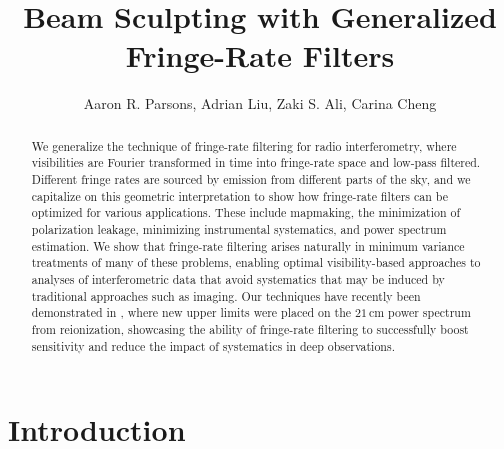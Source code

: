 \documentclass[twocolumn,apj,numberedappendix]{emulateapj}
\begin{document}
\title{Beam Sculpting with Generalized Fringe-Rate Filters}

\author{
Aaron R. Parsons,
Adrian Liu,
Zaki S. Ali,
Carina Cheng
}


\begin{abstract}
We generalize the technique of fringe-rate filtering for radio interferometry, where visibilities 
are Fourier transformed in time into fringe-rate space and low-pass filtered. Different fringe rates
are sourced by emission from different parts of the sky, and we capitalize on this geometric
interpretation to show how fringe-rate filters can be optimized for various applications.
These
include mapmaking, the minimization of polarization leakage, minimizing instrumental systematics,
and power spectrum estimation. We show that fringe-rate filtering arises naturally in minimum variance
treatments of many of these problems, enabling optimal visibility-based approaches to analyses of
interferometric data that avoid systematics that may be induced by traditional approaches such as imaging. Our techniques have
recently been demonstrated in \citet{ali_et_al2015}, where new upper limits
were placed on the $21\,\textrm{cm}$ power spectrum from reionization, showcasing the ability
of fringe-rate filtering to successfully boost sensitivity and reduce the impact of systematics in
deep observations.
\end{abstract}



\section{Introduction}
\end{document}
